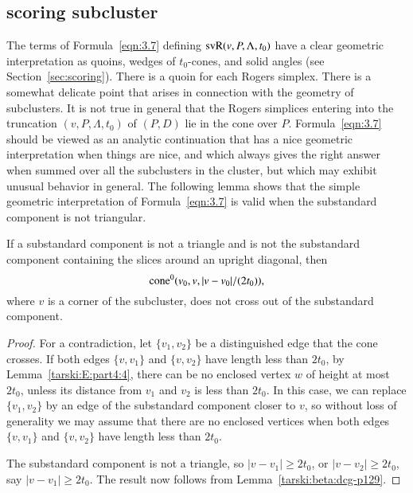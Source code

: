 \subsection{scoring subcluster} %


The terms of Formula~\ref{eqn:3.7} defining
${\operatorname{svR}}(v,P,\Lambda,t_0)$ have a clear geometric
interpretation as quoins, wedges of $t_0$-cones, and solid angles
(see Section~\ref{sec:scoring}). There is a quoin for each Rogers
simplex. There is a somewhat delicate point that arises in
connection with the geometry of subclusters.  It is not true in
general that the Rogers simplices entering into the truncation
$(v,P,\Lambda,t_0)$ of $(P,D)$ lie in the cone over $P$.
Formula~\ref{eqn:3.7} should be viewed as an analytic continuation
that has a nice geometric interpretation when things are nice, and
which always gives the right answer when summed over all the
subclusters in the cluster, but which may exhibit unusual behavior
in general. The following lemma shows that the simple geometric
interpretation of Formula~\ref{eqn:3.7} is valid when the
substandard component is not triangular.



\begin{lemma}
    \label{lemma:no-cross}
If a substandard component is not a triangle and is not  the substandard component
containing the slices around an upright diagonal, then
   $${\operatorname{cone}}^0(v_0,v,|v-v_0|/(2t_0)),$$
where $v$ is a corner of the subcluster,
does not cross out of the substandard component.

\end{lemma}

\begin{proof}
For a contradiction, let $\{v_1,v_2\}$ be a distinguished edge that
the cone crosses. If both edges $\{v,v_1\}$ and $\{v,v_2\}$ have
length less than $2t_0$, by Lemma~\ref{tarski:E:part4:4},
there can be no enclosed vertex $w$ of
height at most $2t_0$, unless its distance from $v_1$ and $v_2$ is
less than $2t_0$.
In this case, we can replace $\{v_1,v_2\}$ by an edge of the
substandard component closer to $v$, so without loss of generality we may
assume that there are no enclosed vertices when both edges
$\{v,v_1\}$ and $\{v,v_2\}$ have length less than $2t_0$.

The substandard component is not a triangle, so $|v-v_1|\ge 2t_0$, or
$|v-v_2|\ge 2t_0$, say $|v-v_1|\ge 2t_0$.  The result now follows
from Lemma~\ref{tarski:beta:dcg-p129}.
\end{proof}

